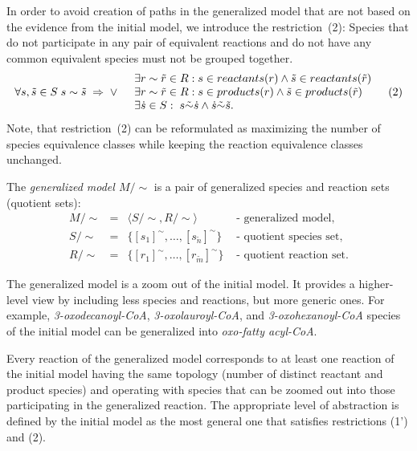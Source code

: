 \documentclass[9pt]{article}
\newcounter{def}
\newcounter{rm}
\begin{document}
In order to avoid creation of paths in the generalized model that are not based on the evidence from the initial model, we introduce the restriction~(2): Species that do not participate in any pair of equivalent reactions and do not have any common equivalent species must not be grouped together.
\[ \begin{array}{clr}
\mbox{$\forall s, \tilde{s} \in S\; s \sim \tilde{s} \;\Rightarrow\;\lor$} & 
\begin{array}{l}
	\mbox{$\exists r \sim \tilde{r} \in R: s \in reactants(r) \land \tilde{s} \in reactants(\tilde{r})$} \\
	\mbox{$\exists r \sim \tilde{r} \in R: s \in products(r) \land \tilde{s} \in products(\tilde{r})$} \\
	\mbox{$ \exists \dot{s} \in S:\; s \tilde{\sim} \dot{s} \land \dot{s} \tilde{\sim} \tilde{s}$}.
\end{array} & (2)
\end{array} \]
Note, that restriction~(2) can be reformulated as maximizing the number of species equivalence classes while keeping the reaction equivalence classes unchanged. 

The \emph{generalized model $M/\sim$} is a pair of generalized species and reaction sets (quotient sets):
\[ \begin{array}{ccll}
\mbox{$M/\sim$} & \mbox{$=$} & \mbox{$\langle S/\sim, R/\sim \rangle$} & \mbox{ - generalized model,} \\
\mbox{$S/\sim$} & \mbox{$=$} & \mbox{$\{[s_1]^{\sim}, \ldots, [s_{\tilde{n}}]^{\sim}\}$} &  \mbox{ - quotient species set,} \\
\mbox{$R/\sim$} & \mbox{$=$} & \mbox{$\{[r_1]^{\sim}, \ldots, [r_{\tilde{m}}]^{\sim}\}$} &  \mbox{ - quotient reaction set.} 
\end{array} \]

The generalized model is a zoom out of the initial model. It provides a higher-level view by including less species and reactions, but more generic ones. For example, \textit{3-oxodecanoyl-CoA}, \textit{3-oxolauroyl-CoA}, and \textit{3-oxohexanoyl-CoA} species of the initial model can be generalized into \textit{oxo-fatty acyl-CoA}. 

Every reaction of the generalized model corresponds to at least one reaction of the initial model having the same topology (number of distinct reactant and product species) and operating with species that can be zoomed out into those participating in the generalized reaction. The appropriate level of abstraction is defined by the initial model as the most general one that satisfies restrictions (1') and (2).
\end{document}
